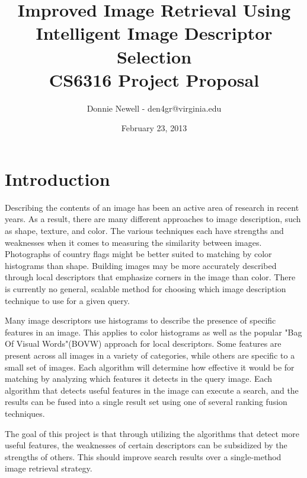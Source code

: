 \documentclass[12pt]{article}
\begin{document}
\title {Improved Image Retrieval Using Intelligent Image Descriptor Selection \\ CS6316 Project Proposal}

\author{Donnie Newell - den4gr@virginia.edu}

\date{February 23, 2013}
\maketitle

\section{Introduction}
Describing the contents of an image has been an active area of research in recent years. As a result, there are many different approaches to image description, such as shape, texture, and color. The various techniques each have strengths and weaknesses when it comes to measuring the similarity between images. Photographs of country flags might be better suited to matching by color histograms than shape. Building images may be more accurately described through local descriptors that emphasize corners in the image than color. There is currently no general, scalable method for choosing which image description technique to use for a given query.

Many image descriptors use histograms to describe the presence of specific features in an image. This applies to color histograms as well as the popular "Bag Of Visual Words"(BOVW) approach for local descriptors\cite{1541280}. Some features are present across all images in a variety of categories, while others are specific to a small set of images. Each algorithm will determine how effective it would be for matching by analyzing which features it detects in the query image. Each algorithm that detects useful features in the image can execute a search, and the results can be fused into a single result set using one of several ranking fusion techniques.

The goal of this project is that through utilizing the algorithms that detect more useful features, the weaknesses of certain descriptors can be subsidized by the strengths of others. This should improve search results over a single-method image retrieval strategy.
\end{document}
